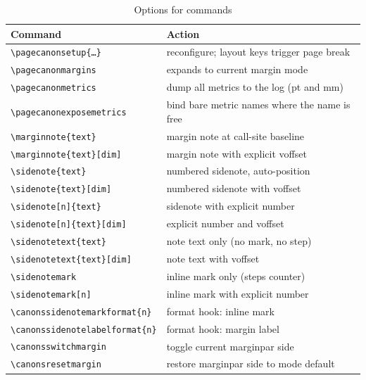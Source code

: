 \documentclass[11pt, twoside, openany]{book}
\newcommand{\cmd}[1]{\texttt{\textbackslash #1}}
\begin{document}
\begin{table}
	\centering
	\caption{Options for commands}
	\label{tab:commandsoptions}
	\begin{tabular}{ll}
		\textbf{Command}                              & \textbf{Action}                             \\
		\hline
		\cmd{pagecanonsetup}\texttt{\{\ldots\}}       & reconfigure; layout keys trigger page break \\
		\cmd{pagecanonmargins}                        & expands to current margin mode              \\[3pt]
        \cmd{pagecanonmetrics}                        & dump all metrics to the log (pt and mm)     \\
		\cmd{pagecanonexposemetrics}                  & bind bare metric names where the name is free\\[3pt]

		\cmd{marginnote}\texttt{\{text\}}             & margin note at call-site baseline           \\
		\cmd{marginnote}\texttt{\{text\}[dim]}        & margin note with explicit voffset           \\[3pt]
		\cmd{sidenote}\texttt{\{text\}}               & numbered sidenote, auto-position            \\
		\cmd{sidenote}\texttt{\{text\}[dim]}          & numbered sidenote with voffset              \\
		\cmd{sidenote}\texttt{[n]\{text\}}            & sidenote with explicit number               \\
		\cmd{sidenote}\texttt{[n]\{text\}[dim]}       & explicit number and voffset                 \\
		\cmd{sidenotetext}\texttt{\{text\}}           & note text only (no mark, no step)           \\
		\cmd{sidenotetext}\texttt{\{text\}[dim]}      & note text with voffset                      \\
		\cmd{sidenotemark}                            & inline mark only (steps counter)            \\
		\cmd{sidenotemark}\texttt{[n]}                & inline mark with explicit number            \\[3pt]
		\cmd{canonssidenotemarkformat}\texttt{\{n\}}  & format hook: inline mark                    \\
		\cmd{canonssidenotelabelformat}\texttt{\{n\}} & format hook: margin label                   \\[3pt]
		\cmd{canonsswitchmargin}                      & toggle current marginpar side               \\
		\cmd{canonsresetmargin}                       & restore marginpar side to mode default      \\
	\end{tabular}
\end{table}
\end{document}
